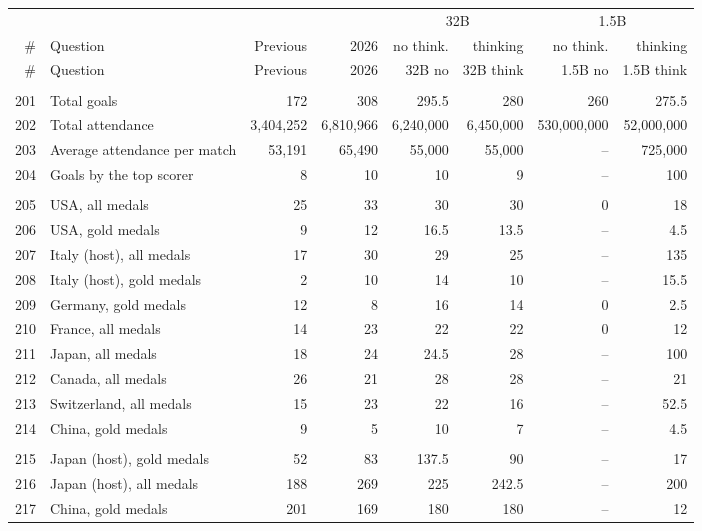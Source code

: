 \documentclass[11pt,a4paper]{article}
\begin{document}
{\footnotesize
\setlength{\tabcolsep}{4pt}
\begin{longtable}{@{}r>{\raggedright\arraybackslash}p{4.3cm}rrrrrr@{}}
\toprule
& & & & \multicolumn{2}{c}{32B} & \multicolumn{2}{c}{1.5B} \\
\cmidrule(lr){5-6}\cmidrule(l){7-8}
\# & Question & Previous & 2026 & no think. & thinking & no think. & thinking \\
\midrule
\endfirsthead
\toprule
\# & Question & Previous & 2026 & 32B no & 32B think & 1.5B no & 1.5B think \\
\midrule
\endhead
\bottomrule
\endfoot
\multicolumn{8}{@{}l}{\textit{World Cup}} \\
201 & Total goals & 172 & 308 & 295.5 & 280 & 260 & 275.5 \\
202 & Total attendance & 3,404,252 & 6,810,966 & 6,240,000 & 6,450,000 & 530,000,000 & 52,000,000 \\
203 & Average attendance per match & 53,191 & 65,490 & 55,000 & 55,000 & -- & 725,000 \\
204 & Goals by the top scorer & 8 & 10 & 10 & 9 & -- & 100 \\
\addlinespace
\multicolumn{8}{@{}l}{\textit{Winter Olympics}} \\
205 & USA, all medals & 25 & 33 & 30 & 30 & 0 & 18 \\
206 & USA, gold medals & 9 & 12 & 16.5 & 13.5 & -- & 4.5 \\
207 & Italy (host), all medals & 17 & 30 & 29 & 25 & -- & 135 \\
208 & Italy (host), gold medals & 2 & 10 & 14 & 10 & -- & 15.5 \\
209 & Germany, gold medals & 12 & 8 & 16 & 14 & 0 & 2.5 \\
210 & France, all medals & 14 & 23 & 22 & 22 & 0 & 12 \\
211 & Japan, all medals & 18 & 24 & 24.5 & 28 & -- & 100 \\
212 & Canada, all medals & 26 & 21 & 28 & 28 & -- & 21 \\
213 & Switzerland, all medals & 15 & 23 & 22 & 16 & -- & 52.5 \\
214 & China, gold medals & 9 & 5 & 10 & 7 & -- & 4.5 \\
\addlinespace
\multicolumn{8}{@{}l}{\textit{Asian Games}} \\
215 & Japan (host), gold medals & 52 & 83 & 137.5 & 90 & -- & 17 \\
216 & Japan (host), all medals & 188 & 269 & 225 & 242.5 & -- & 200 \\
217 & China, gold medals & 201 & 169 & 180 & 180 & -- & 12 \\

\end{longtable}}
\end{document}
